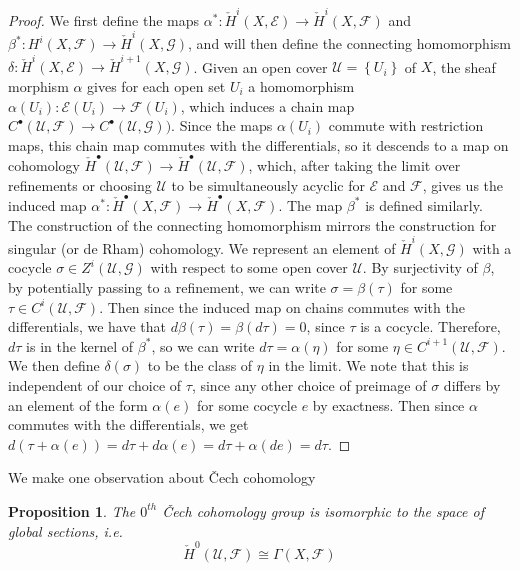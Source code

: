 \documentclass[psamsfonts, 12pt]{amsart}
\newtheorem{prop}[thm]{Proposition}
\theoremstyle{definition}
\theoremstyle{remark}
\newcommand{\set}[1]{\left\lbrace #1 \right\rbrace}
\begin{document}
\begin{proof}
We first define the maps
$\alpha^* : \check{H}^i(X,\mathcal{E}) \to \check{H}^i(X, \mathcal{F})$
and $\beta^* : H^i(X, \mathcal{F}) \to \check{H}^i(X, \mathcal{G})$, and will then define
the connecting homomorphism
$\delta : \check{H}^i(X,\mathcal{E}) \to \check{H}^{i+1}(X, \mathcal{G})$. Given
an open cover $\mathcal{U} = \set{U_i}$ of $X$, the sheaf morphism $\alpha$ gives for
each open set $U_i$ a homomorphism $\alpha(U_i) : \mathcal{E}(U_i) \to \mathcal{F}(U_i)$,
which induces a chain map
$C^\bullet(\mathcal{U},\mathcal{F}) \to C^\bullet(\mathcal{U}, \mathcal{G}))$. Since
the maps $\alpha(U_i)$ commute with restriction maps, this chain map commutes with
the differentials, so it descends to a map on cohomology
$\check{H}^\bullet(\mathcal{U},\mathcal{F})\to\check{H}^\bullet(\mathcal{U},\mathcal{F})$,
which, after taking the limit over refinements or choosing $\mathcal{U}$ to be
simultaneously acyclic for $\mathcal{E}$ and $\mathcal{F}$, gives us the induced
map $\alpha^* : \check{H}^\bullet(X,\mathcal{F})\to\check{H}^\bullet(X,\mathcal{F})$.
The map $\beta^*$ is defined similarly. \\

The construction of the connecting homomorphism
mirrors the construction for singular (or de Rham) cohomology. We represent
an element of $\check{H}^i(X,\mathcal{G})$ with a cocycle
$\sigma \in Z^i(\mathcal{U}, \mathcal{G})$ with respect to some open cover $\mathcal{U}$.
By surjectivity of $\beta$, by potentially passing to a refinement, we can
write $\sigma = \beta(\tau)$ for some $\tau \in C^i(\mathcal{U}, \mathcal{F})$. Then
since the induced map on chains commutes with the differentials, we have that
$d\beta(\tau) = \beta(d\tau) = 0$, since $\tau$ is a cocycle. Therefore,
$d\tau$ is in the kernel of $\beta^*$, so we can write $d\tau = \alpha(\eta)$
for some $\eta \in C^{i+1}(\mathcal{U}, \mathcal{F})$. We then define
$\delta(\sigma)$ to be the class of $\eta$ in the limit. We note that
this is independent of our choice of $\tau$, since any other choice of
preimage of $\sigma$ differs by an element of the form $\alpha(e)$ for some cocycle
$e$ by exactness. Then since $\alpha$ commutes with the differentials, we get
$d(\tau + \alpha(e)) = d\tau + d\alpha(e) = d\tau + \alpha(de) = d\tau$.
\end{proof}
%
We make one observation about \v{C}ech cohomology
%
\begin{prop}
The $0^{th}$ \v{C}ech cohomology group is isomorphic to the space of global sections, i.e.
\[
\check{H}^0(\mathcal{U}, \mathcal{F}) \cong \Gamma(X, \mathcal{F})
\]
\end{prop}
\end{document}
